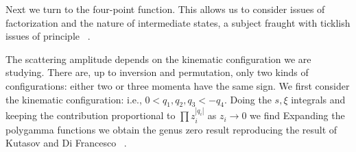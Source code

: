 
Next we turn to the four-point function. This allows us
to consider issues of factorization and the nature of 
intermediate states, a subject fraught with ticklish
issues of principle \natiliouv\ . 

The scattering amplitude depends on the kinematic configuration we 
are studying. There are, up to inversion and permutation, only
 two kinds of configurations:
either two or three momenta have the same sign.
We first consider the kinematic configuration:
\eqn{}
i.e., $0<q_1,q_2,q_3<-q_4$. 
Doing the $s,\xi$ integrals and keeping the 
contribution proportional to 
$\prod z_i^{|q_i|}$ as $z_i\to 0$
we find
\eqn{}
Expanding the polygamma functions we obtain the genus zero result
\eqn{}
reproducing the result of Kutasov and Di Francesco \kutasov\ . 

